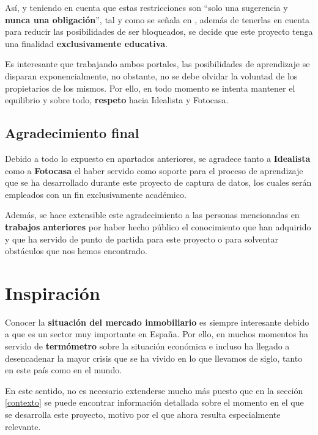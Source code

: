 \documentclass[12pt]{article}
\begin{document}
Así, y teniendo en cuenta que estas restricciones son ``solo una sugerencia y \textbf{nunca una obligación}'', tal y como se señala en \cite{tip2}, además de tenerlas en cuenta para reducir las posibilidades de ser bloqueados, se decide que este proyecto tenga una finalidad \textbf{exclusivamente educativa}. 

Es interesante que trabajando ambos portales, las posibilidades de aprendizaje se disparan exponencialmente, no obstante, no se debe olvidar la voluntad de los propietarios de los mismos. Por ello, en todo momento se intenta mantener el equilibrio y sobre todo, \textbf{respeto} hacia Idealista y Fotocasa. 

\vspace{-1.5em}\subsection*{Agradecimiento final}\vspace{-1.0em}

Debido a todo lo expuesto en apartados anteriores, se agradece tanto a \textbf{Idealista} como a \textbf{Fotocasa} el haber servido como soporte para el proceso de aprendizaje que se ha desarrollado durante este proyecto de captura de datos, los cuales serán empleados con un fin exclusivamente académico. 

Además, se hace extensible este agradecimiento a las personas mencionadas en \textbf{trabajos anteriores} por haber hecho público el conocimiento que han adquirido y que ha servido de punto de partida para este proyecto o para solventar obstáculos que nos hemos encontrado. 

\vspace{-1.5em}\section{Inspiración}\vspace{-1.5em}

Conocer la \textbf{situación del mercado inmobiliario} es siempre interesante debido a que es un sector muy importante en España. Por ello, en muchos momentos ha servido de \textbf{termómetro} sobre la situación económica e incluso ha llegado a desencadenar la mayor crisis que se ha vivido en lo que llevamos de siglo, tanto en este país como en el mundo. 

En este sentido, no es necesario extenderse mucho más puesto que en la sección \ref{contexto} se puede encontrar información detallada sobre el momento en el que se desarrolla este proyecto, motivo por el que ahora resulta especialmente relevante.
\end{document}
